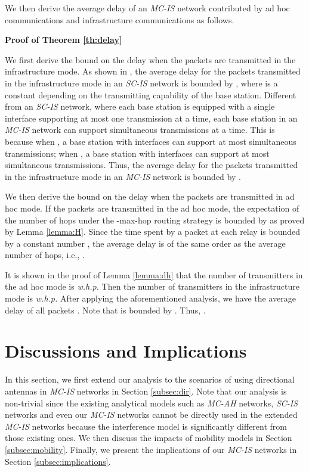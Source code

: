 \documentclass[10pt,journal]{IEEEtran}
\def\done{\hspace*{\fill} }
\begin{document}
We then derive the average delay of an \textit{MC-IS} network contributed by ad hoc communications and infrastructure communications as follows.

\textbf{Proof of Theorem \ref{th:delay}}

We first derive the bound on the delay when the packets are transmitted in the infrastructure mode. As shown in \cite{panli:jsac09}, the average delay for the packets transmitted in the infrastructure mode in an \textit{SC-IS} network is bounded by , where  is a constant depending on the transmitting capability of the base station. Different from an \textit{SC-IS} network, where each base station is equipped with a single interface supporting at most one transmission at a time, each base station in an \textit{MC-IS} network can support  simultaneous transmissions at a time. This is because when , a base station with  interfaces can support at most  simultaneous transmissions; when , a base station with  interfaces can support at most  simultaneous transmissions. Thus, the average delay for the packets transmitted in the infrastructure mode in an \textit{MC-IS} network is bounded by .

We then derive the bound on the delay when the packets are transmitted in ad hoc mode. If the packets are transmitted in the ad hoc mode, the expectation of the number of hops  under the -max-hop routing strategy is bounded by  as proved by Lemma \ref{lemma:H}. Since the time spent by a packet at each relay is bounded by a constant number , the average delay is of the same order as the average number of hops, i.e., . 

It is shown in the proof of Lemma \ref{lemma:dh} that the number of transmitters in the ad hoc mode is  \textit{w.h.p.} Then the number of transmitters in the infrastructure mode is  \textit{w.h.p.} After applying the aforementioned analysis, we have the average delay of all packets . Note that  is bounded by . Thus, . 
\done

\section{Discussions and Implications}
\label{sec:discussion}
In this section, we first extend our analysis to the scenarios of using directional antennas in \emph{MC-IS} networks in Section \ref{subsec:dir}. Note that our analysis is non-trivial since the existing analytical models such as \emph{MC-AH} networks, \emph{SC-IS} networks and even our \emph{MC-IS} networks cannot be directly used in the extended \emph{MC-IS} networks because the interference model is significantly different from those existing ones. We then discuss the impacts of mobility models in Section \ref{subsec:mobility}. Finally, we present the implications of our \emph{MC-IS} networks in Section \ref{subsec:implications}.
\end{document}
